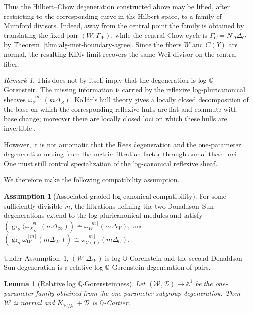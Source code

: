 \documentclass[11pt]{amsart}
\newtheorem{lemma}[theorem]{Lemma}
\theoremstyle{definition}
\newtheorem{assumption}[theorem]{Assumption}
\theoremstyle{remark}
\newtheorem*{remark}{Remark}
\begin{document}
Thus the Hilbert--Chow degeneration constructed above may be lifted, after
restricting to the corresponding curve in the Hilbert space, to a family of
Mumford divisors. Indeed, away from the central point the family is obtained by
translating the fixed pair $(W,\Gamma_W)$, while the central Chow cycle is
$\Gamma_C=N_\Delta\Delta_C$ by
Theorem~\ref{thm:alg-met-boundary-agree}. Since the fibers $W$ and $C(Y)$ are
normal, the resulting KDiv limit recovers the same Weil divisor on the central
fiber.

\begin{remark} This does not by itself imply that the degeneration is log
$\mathbb Q$-Gorenstein. The missing information is carried by the reflexive
log-pluricanonical sheaves $\omega_Z^{[m]}(m\Delta_Z)$. Koll\'ar's hull theory gives a locally closed decomposition of the base on which the corresponding reflexive hulls are flat and commute with base change;
moreover there are locally closed loci on which these hulls are invertible
\cite[Cor.~3.30, Prop.~3.31]{KollarFamiliesGeneralType}. 

However, it is not automatic that the Rees degeneration and the
one-parameter degeneration arising from the metric filtration factor through
one of these loci. One must still control specialization of the
log-canonical reflexive sheaf.
\end{remark}



We therefore make the following compatibility assumption.

\begin{assumption}[Associated-graded log-canonical compatibility]
\label{ass}
For some sufficiently divisible $m$, the filtrations defining the two
Donaldson--Sun degenerations extend to the log-pluricanonical modules and
satisfy
$
\left(
\operatorname{gr}_{\nu}
(\omega_{X_\infty}^{[m]}(m\Delta_\infty)
\right)^{}
\cong
\omega_W^{[m]}(m\Delta_W),
$
and
$
\left(
\operatorname{gr}_{\eta}
\omega_W^{[m]}(m\Delta_W)
\right)^{}
\cong
\omega_{C(Y)}^{[m]}(m\Delta_C).
$
\end{assumption}

Under Assumption~\ref{ass}, $(W,\Delta_W)$ is log
$\mathbb Q$-Gorenstein and the second Donaldson--Sun degeneration is a relative
log $\mathbb Q$-Gorenstein degeneration of pairs.



\begin{lemma}[Relative log $\mathbb Q$-Gorensteinness]
\label{lem:relative-log-qg}
Let $(\mathcal W,\mathcal D)\to\mathbb A^1$ be the one-parameter family obtained from the one-parameter subgroup degeneration. Then $\mathcal W$ is normal and $K_{\mathcal W/\mathbb A^1}+\mathcal D$ is $\mathbb Q$-Cartier.
\end{lemma}
\end{document}
